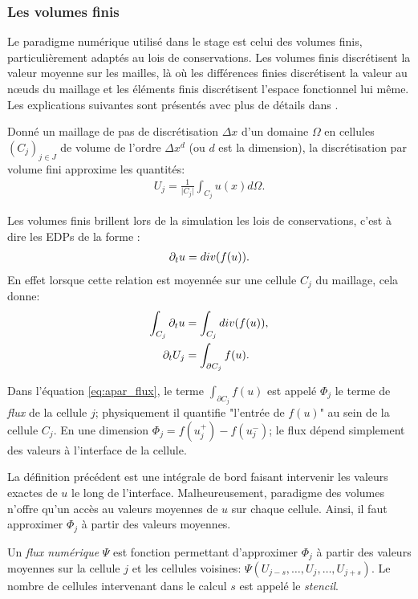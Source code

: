 \subsubsection{Les volumes finis}
    Le paradigme numérique utilisé dans le stage est celui des volumes finis, particulièrement adaptés au lois de conservations.
    Les volumes finis discrétisent la valeur moyenne sur les mailles, là où les différences finies discrétisent la valeur au nœuds du maillage et 
    les éléments finis discrétisent l'espace fonctionnel lui même. Les explications suivantes sont présentés avec plus de détails dans \cite{LeVeque1990}.
    \begin{definition}
        Donné un maillage de pas de discrétisation $\Delta x$ d'un domaine $\Omega$ en cellules $(C_j)_{j\in J}$ de volume de l'ordre $\Delta x^d$ (ou $d$ est la dimension), 
        la discrétisation par volume fini approxime les quantités:
        \begin{align}
            U_j = \frac{1}{\vert C_j \vert} \int_{C_j} u(x) d\Omega.
        \end{align}
    \end{definition}
    Les volumes finis brillent lors de la simulation les lois de conservations, c'est à dire les EDPs de la forme :
    \begin{align}
        \partial_t u = div(f(u)).
    \end{align}
    En effet lorsque cette relation est moyennée sur une cellule $C_j$ du maillage, cela donne: 
    \begin{align}
        \int_{C_j} \partial_t u&= \int_{C_j}  div(f(u)),\\
        \partial_t U_j &= \int_{\partial C_j} f(u).\label{eq:apar_flux}
    \end{align}
    \begin{definition}
        Dans l'équation \ref{eq:apar_flux}, le terme $\int_{\partial C_j} f(u)$ est appelé $\Phi_j$ le terme de \textit{flux} de la cellule $j$;
        physiquement il quantifie "l'entrée de $f(u)$" au sein de la cellule $C_j$. En une dimension $\Phi_j = f(u^+_j) - f(u^-_j)$;
        le flux dépend simplement des valeurs à l'interface de la cellule.
    \end{definition}
    La définition précédent est une intégrale de bord faisant intervenir les valeurs exactes de $u$ le long de l'interface.
    Malheureusement, paradigme des volumes n'offre qu'un accès au valeurs moyennes de $u$ sur chaque cellule.
    Ainsi, il faut approximer $\Phi_j$ à partir des valeurs moyennes.
    \begin{definition}
        Un \textit{flux numérique} $\Psi$ est fonction permettant d’approximer $\Phi_j$ à partir des valeurs moyennes sur la cellule $j$ et les cellules voisines:
        $\Psi(U_{j-s} , \ldots , U_j ,\ldots , U_{j+s})$. Le nombre de cellules intervenant dans le calcul $s$ est appelé le \textit{stencil}.
    \end{definition}

